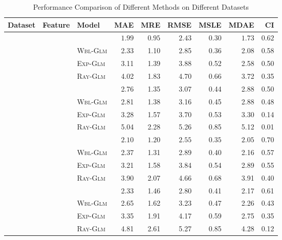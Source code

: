 \begin{table}[t]
	\centering
	\caption{Performance Comparison of Different Methods on Different Datasets}
	\label{table:results}
	\footnotesize
	\begin{tabu} to \columnwidth {c c l r r r r r r}
		\toprule
		Dataset & Feature &
		Model &  MAE &   MRE &   RMSE &   MSLE &   MDAE &  CI \\
		\midrule
		& 
		& \npglm  &  $\bm{1.99}$ &  $\bm{0.95}$ &   $\bm{2.43}$ &   $\bm{0.30}$ &  $\bm{1.73}$ & $\bm{0.62}$ \\
		& & \textsc{Wbl-Glm} &  2.33 &  1.10 &   2.85 &   0.36 &   2.08 & 0.58 \\
		& & \textsc{Exp-Glm} &  3.11 &  1.39 &   3.88 &   0.52 &   2.58 & 0.50 \\
		& & \textsc{Ray-Glm} &  4.02 &  1.83 &   4.70 &   0.66 &   3.72 & 0.35 \\
		
		&                                                   
		& \npglm               &  2.76 &  1.35 &   3.07 &   0.44 &   2.88 & 0.50 \\
		& & \textsc{Wbl-Glm}     &  2.81 &  1.38 &   3.16 &   0.45 &   2.88 & 0.48 \\
		& & \textsc{Exp-Glm}     &  3.28 &  1.57 &   3.70 &   0.53 &   3.30 & 0.14 \\
		& & \textsc{Ray-Glm}     &  5.04 &  2.28 &   5.26 &   0.85 &   5.12 & 0.01 \\
		
		\midrule
		& 
		& \npglm  &  $\bm{2.10}$ &  $\bm{1.20}$ &   $\bm{2.55}$ &   $\bm{0.35}$ &   $\bm{2.05}$ & $\bm{0.70}$ \\
		& & \textsc{Wbl-Glm} &  2.37 &  1.31 &   2.89 &   0.40 &   2.16 & 0.57 \\
		& & \textsc{Exp-Glm} &  3.21 &  1.58 &   3.84 &   0.54 &   2.89 & 0.55 \\
		& & \textsc{Ray-Glm} &  3.90 &  2.07 &   4.66 &   0.68 &   3.91 & 0.40 \\
		
		&                                                   
		& \npglm               &  2.33 &  1.46 &   2.80 &   0.41 &   2.17 & 0.61 \\
		& & \textsc{Wbl-Glm}     &  2.65 &  1.62 &   3.23 &   0.47 &   2.26 & 0.43 \\
		& & \textsc{Exp-Glm}     &  3.35 &  1.91 &   4.17 &   0.59 &   2.75 & 0.35 \\
		& & \textsc{Ray-Glm}     &  4.81 &  2.61 &   5.27 &   0.85 &   4.28 & 0.12 \\
		

\end{tabu}
\end{table}
